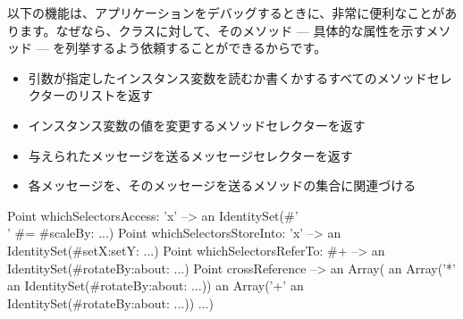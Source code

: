 \documentclass[a4paper,10pt,twoside]{book}
\begin{document}
以下の機能は、アプリケーションをデバッグするときに、非常に便利なことがあります。なぜなら、クラスに対して、そのメソッド --- 具体的な属性を示すメソッド --- を列挙するよう依頼することができるからです。
\begin{itemize}
\item {} 引数が指定したインスタンス変数を読むか書くかするすべてのメソッドセレクターのリストを返す %
\item {} インスタンス変数の値を変更するメソッドセレクターを返す
\item {} 与えられたメッセージを送るメッセージセレクターを返す
\item {} 各メッセージを、そのメッセージを送るメソッドの集合に関連づける %
\end{itemize}

\begin{code}{} %
Point whichSelectorsAccess: 'x'    --> an IdentitySet(#'\\' #= #scaleBy: ...)
Point whichSelectorsStoreInto: 'x' --> an IdentitySet(#setX:setY: ...)
Point whichSelectorsReferTo: #+  --> an IdentitySet(#rotateBy:about: ...)
Point crossReference --> an Array(
		an Array('*' an IdentitySet(#rotateBy:about: ...))
		an Array('+' an IdentitySet(#rotateBy:about: ...))
		...)
\end{code}
\end{document}
